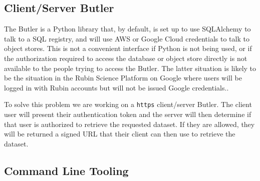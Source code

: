 \documentclass[]{spie}
\begin{document}
\subsection{Client/Server Butler}

The Butler is a Python library that, by default, is set up to use SQLAlchemy to talk to a SQL registry, and will use AWS or Google Cloud credentials to talk to object stores.
This is not a convenient interface if Python is not being used, or if the authorization required to access the database or object store directly is not available to the people trying to access the Butler.
The latter situation is likely to be the situation in the Rubin Science Platform on Google where users will be logged in with Rubin accounts but will not be issued Google credentials.\cite{DMTN-182,2021arXiv211115030O}.

To solve this problem we are working on a \texttt{https} client/server Butler\cite{DMTN-176}.
The client user will present their authentication token and the server will then determine if that user is authorized to retrieve the requested dataset.
If they are allowed, they will be returned a signed URL that their client can then use to retrieve the dataset.

\subsection{Command Line Tooling}
\end{document}
